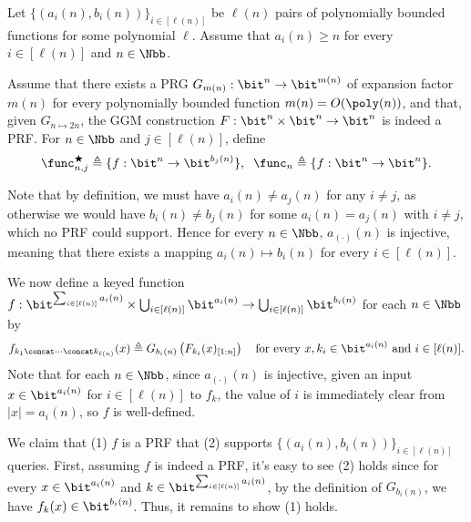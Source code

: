 \begin{answer}[b]
    Let $\{(a_i(n), b_i(n))\}_{i\in [\ell(n)]}$ be $\ell(n)$ pairs of polynomially bounded functions for some polynomial $\ell$. Assume that $a_i(n)\ge n$ for every $i\in[\ell(n)]$ and $n\in\Nbb$.
    
    Assume that there exists a PRG $G_{m(n)}: \bit^n\to\bit^{m(n)}$ of expansion factor $m(n)$ for every polynomially bounded function $m(n)=O(\poly(n))$, and that, given $G_{n\mapsto 2n}$, the GGM construction $F:\bit^n\times \bit^n \to\bit^n$ is indeed a PRF.
    For $n\in\Nbb$ and $j\in [\ell(n)]$, define 
    \begin{gather*}
        \func_{n,j}^\bigstar\triangleq \{f:\bit^n\to\bit^{b_j(n)}\},\;\;
        \func_n\triangleq \{f:\bit^n\to\bit^n\}.
    \end{gather*}

    Note that by definition, we must have $a_i(n)\neq a_j(n)$ for any $i\neq j$, as otherwise we would have $b_i(n)\neq b_j(n)$ for some $a_i(n)= a_j(n)$ with $i\neq j$, which no PRF could support. Hence for every $n\in\Nbb$, $a_{(\cdot)}(n)$ is injective, meaning that there exists a mapping $ a_i(n)\mapsto b_i(n)$ for every $i\in [\ell(n)]$. 

    We now define a keyed function $f:\bit^{\sum_{i\in [\ell(n)]} a_i(n)} \times \bigcup_{i\in[\ell(n)]} \bit^{a_i(n)} \to \bigcup_{i\in[\ell(n)]} \bit^{b_i(n)}$ for each $n\in\Nbb$ by
    \[
        f_{k_1\concat\cdots\concat k_{\ell(n)}}(x) \triangleq G_{b_i(n)} \left( F_{k_i}( x)_{[1:n]} \right)
        \quad \textrm{for every } x,k_i\in\bit^{a_i(n)} \textrm{ and } i\in [\ell(n)].
    \]
    Note that for each $n\in\Nbb$, since $a_{(\cdot)}(n)$ is injective, given an input $x\in\bit^{a_i(n)}$ for $i\in [\ell(n)]$ to $f_k$, the value of $i$ is immediately clear from $|x|=a_i(n)$, so $f$ is well-defined.

    We claim that (1) $f$ is a PRF that (2) supports $\{(a_i(n), b_i(n))\}_{i\in [\ell(n)]}$ queries. First, assuming $f$ is indeed a PRF, it's easy to see (2) holds since for every $x\in\bit^{a_i(n)}$ and $k\in \bit^{\sum_{i\in [\ell(n)]} a_i(n)}$, by the definition of $G_{b_i(n)}$, we have $f_k(x)\in\bit^{b_i(n)}$. Thus, it remains to show (1) holds.


\end{answer}
